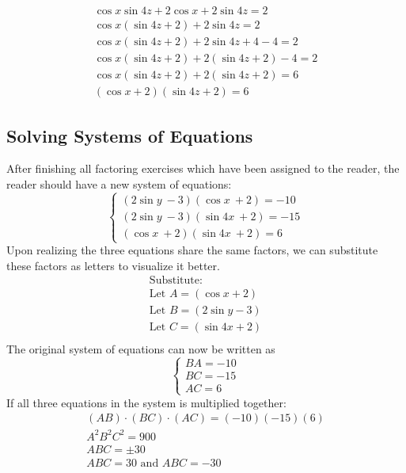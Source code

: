 \documentclass[a4paper,12pt]{article}
\begin{document}
\begin{equation}
    \begin{split}
        \cos x\sin 4z + 2\cos x + 2\sin 4z = 2 \\
        \cos x(\sin 4z + 2) + 2\sin 4z = 2 \\
        \cos x(\sin 4z + 2) + 2\sin 4z + 4- 4 = 2 \\
        \cos x(\sin 4z + 2) + 2(\sin 4z + 2)- 4 = 2 \\
        \cos x(\sin 4z + 2) + 2(\sin 4z + 2) = 6 \\
        (\cos x+2)(\sin 4z + 2)= 6
    \end{split}
\end{equation}

\subsection*{Solving Systems of Equations}
After finishing all factoring exercises which have been assigned to the reader, the reader should have a new system of equations:
$$
\begin{cases}
(2\sin y\ - 3)(\cos x\ + 2) = -10 \\
(2\sin y\ - 3)(\sin 4x\ + 2) = -15 \\
(\cos x\ + 2)(\sin 4x\ + 2) = 6 
\end{cases}
$$
Upon realizing the three equations share the same factors, we can substitute these factors as letters to visualize it better.
\begin{multline}
    \text{Substitute:} \\
    \text{Let } A = (\cos x+2) \\
    \text{Let } B = (2\sin y-3) \\
    \text{Let } C = (\sin 4x+2) \\
\end{multline}
The original system of equations can now be written as
$$
\begin{cases}
    BA = -10 \\
    BC = -15 \\
    AC = 6
\end{cases}
$$
If all three equations in the system is multiplied together:
\begin{equation}
    \begin{split}
        (AB)\cdot(BC)\cdot(AC) = (-10)(-15)(6) \\
        A^2B^2C^2 = 900 \\
        ABC = \pm 30 \\
        ABC = 30 \text{ and } ABC = -30
    \end{split}
\end{equation}
\end{document}
